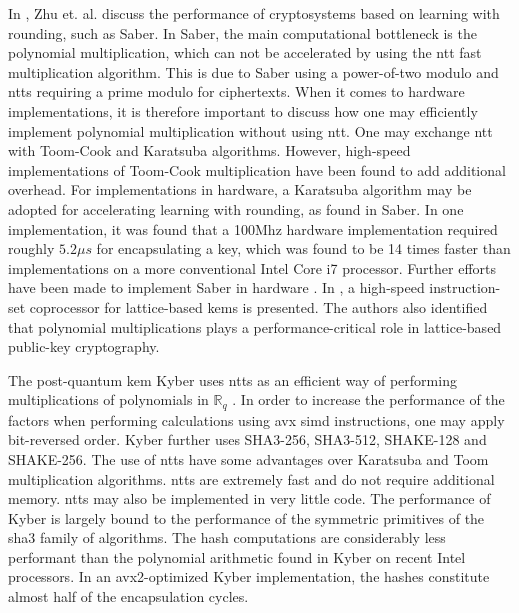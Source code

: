 In \cite{zhu2021}, Zhu et. al. discuss the performance of cryptosystems based on learning with rounding, such as Saber. In Saber, the main computational bottleneck is the polynomial multiplication, which can not be accelerated by using the \gls{ntt} fast multiplication algorithm. This is due to Saber using a power-of-two modulo and \glspl{ntt} requiring a prime modulo for ciphertexts. When it comes to hardware implementations, it is therefore important to discuss how one may efficiently implement polynomial multiplication without using \gls{ntt}. One may exchange \gls{ntt} with Toom-Cook and Karatsuba algorithms. However, high-speed implementations of Toom-Cook multiplication have been found to add additional overhead. For implementations in hardware, a Karatsuba algorithm may be adopted for accelerating learning with rounding, as found in Saber. In one implementation, it was found that a 100Mhz hardware implementation required roughly $5.2\mu s$ for encapsulating a key, which was found to be 14 times faster than implementations on a more conventional Intel Core i7 processor. Further efforts have been made to implement Saber in hardware \cite{roy2020}. In \cite{roy2020}, a high-speed instruction-set coprocessor for lattice-based \glspl{kem} is presented. The authors also identified that polynomial multiplications plays a performance-critical role in lattice-based public-key cryptography.


The \gls{post-quantum} \gls{kem} Kyber uses \glspl{ntt} as an efficient way of performing multiplications of polynomials in $\mathbb{R}_q$ \cite{kyber2021}. In order to increase the performance of the factors when performing calculations using \gls{avx} \gls{simd} instructions, one may apply bit-reversed order. Kyber further uses SHA3-256, SHA3-512, SHAKE-128 and SHAKE-256. The use of \glspl{ntt} have some advantages over Karatsuba and Toom multiplication algorithms. \glspl{ntt} are extremely fast and do not require additional memory. \glspl{ntt} may also be implemented in very little code. The performance of Kyber is largely bound to the performance of the symmetric primitives of the \gls{sha3} family of algorithms. The hash computations are considerably less performant than the polynomial arithmetic found in Kyber on recent Intel processors. In an \gls{avx2}-optimized Kyber implementation, the hashes constitute almost half of the encapsulation cycles.

